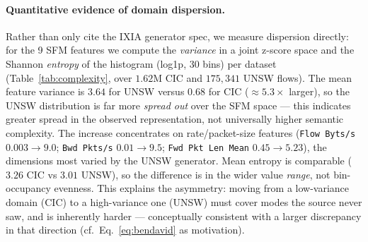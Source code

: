 \documentclass[preprint,12pt,authoryear]{elsarticle}
\begin{document}
\paragraph{Quantitative evidence of domain dispersion.} Rather than only cite the
IXIA generator spec, we measure dispersion directly: for the 9 SFM features we
compute the \emph{variance} in a joint z-score space and the Shannon \emph{entropy}
of the histogram (log1p, 30 bins) per dataset (Table~\ref{tab:complexity}, over
$1.62$M CIC and $175{,}341$ UNSW flows). The mean feature variance is $\mathbf{3.64}$
for UNSW versus $\mathbf{0.68}$ for CIC ($\approx 5.3\times$ larger), so the UNSW
distribution is far more \emph{spread out} over the SFM space --- this indicates
greater spread in the observed representation, not universally higher semantic
complexity. The increase concentrates on rate/packet-size features (\texttt{Flow
Byts/s} $0.003\to9.0$; \texttt{Bwd Pkts/s} $0.01\to9.5$; \texttt{Fwd Pkt Len Mean}
$0.45\to5.23$), the dimensions most varied by the UNSW generator. Mean entropy is
comparable ($3.26$ CIC vs $3.01$ UNSW), so the difference is in the wider value
\emph{range}, not bin-occupancy evenness. This explains the asymmetry: moving from a
low-variance domain (CIC) to a high-variance one (UNSW) must cover modes the source
never saw, and is inherently harder --- conceptually consistent with a larger
discrepancy in that direction (cf.\ Eq.~\eqref{eq:bendavid} as motivation).
\end{document}
